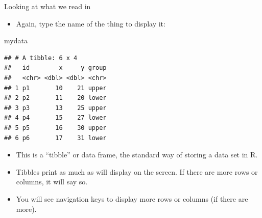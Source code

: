 \documentclass[
  ignorenonframetext,
]{beamer}
\newenvironment{Shaded}{\begin{snugshade}}{\end{snugshade}}
\newcommand{\NormalTok}[1]{#1}
\providecommand{\tightlist}{%
  \setlength{\itemsep}{0pt}\setlength{\parskip}{0pt}}
\begin{document}
\begin{frame}[fragile]{Looking at what we read in}
\protect\hypertarget{looking-at-what-we-read-in}{}

\begin{itemize}
\tightlist
\item
  Again, type the name of the thing to display it:
\end{itemize}

\scriptsize

\begin{Shaded}
\begin{Highlighting}[]
\NormalTok{mydata}
\end{Highlighting}
\end{Shaded}

\begin{verbatim}
## # A tibble: 6 x 4
##   id        x     y group
##   <chr> <dbl> <dbl> <chr>
## 1 p1       10    21 upper
## 2 p2       11    20 lower
## 3 p3       13    25 upper
## 4 p4       15    27 lower
## 5 p5       16    30 upper
## 6 p6       17    31 lower
\end{verbatim}

\normalsize

\begin{itemize}
\tightlist
\item
  This is a ``tibble'' or data frame, the standard way of storing a data
  set in R.
\item
  Tibbles print as much as will display on the screen. If there are more
  rows or columns, it will say so.
\item
  You will see navigation keys to display more rows or columns (if there
  are more).
\end{itemize}

\end{frame}
\end{document}
